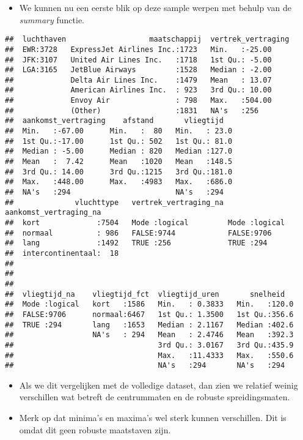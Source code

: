 \documentclass[]{memoir}
\providecommand{\tightlist}{%
  \setlength{\itemsep}{0pt}\setlength{\parskip}{0pt}}
\begin{document}
\begin{itemize}
\tightlist
\item
  We kunnen nu een eerste blik op deze sample werpen met behulp van de \emph{summary} functie.
\end{itemize}

\begin{verbatim}
##  luchthaven                   maatschappij  vertrek_vertraging
##  EWR:3728   ExpressJet Airlines Inc.:1723   Min.   :-25.00    
##  JFK:3107   United Air Lines Inc.   :1718   1st Qu.: -5.00    
##  LGA:3165   JetBlue Airways         :1528   Median : -2.00    
##             Delta Air Lines Inc.    :1479   Mean   : 13.07    
##             American Airlines Inc.  : 923   3rd Qu.: 10.00    
##             Envoy Air               : 798   Max.   :504.00    
##             (Other)                 :1831   NA's   :256       
##  aankomst_vertraging    afstand       vliegtijd    
##  Min.   :-67.00      Min.   :  80   Min.   : 23.0  
##  1st Qu.:-17.00      1st Qu.: 502   1st Qu.: 81.0  
##  Median : -5.00      Median : 820   Median :127.0  
##  Mean   :  7.42      Mean   :1020   Mean   :148.5  
##  3rd Qu.: 14.00      3rd Qu.:1215   3rd Qu.:181.0  
##  Max.   :448.00      Max.   :4983   Max.   :686.0  
##  NA's   :294                        NA's   :294    
##              vluchttype   vertrek_vertraging_na aankomst_vertraging_na
##  kort             :7504   Mode :logical         Mode :logical         
##  normaal          : 986   FALSE:9744            FALSE:9706            
##  lang             :1492   TRUE :256             TRUE :294             
##  intercontinentaal:  18                                               
##                                                                       
##                                                                       
##                                                                       
##  vliegtijd_na    vliegtijd_fct  vliegtijd_uren       snelheid    
##  Mode :logical   kort   :1586   Min.   : 0.3833   Min.   :120.0  
##  FALSE:9706      normaal:6467   1st Qu.: 1.3500   1st Qu.:356.6  
##  TRUE :294       lang   :1653   Median : 2.1167   Median :402.6  
##                  NA's   : 294   Mean   : 2.4746   Mean   :392.3  
##                                 3rd Qu.: 3.0167   3rd Qu.:435.9  
##                                 Max.   :11.4333   Max.   :550.6  
##                                 NA's   :294       NA's   :294
\end{verbatim}

\begin{itemize}
\tightlist
\item
  Als we dit vergelijken met de volledige dataset, dan zien we relatief weinig verschillen wat betreft de centrummaten en de robuste spreidingsmaten.
\item
  Merk op dat minima's en maxima's wel sterk kunnen verschillen. Dit is omdat dit geen robuste maatstaven zijn.
\end{itemize}
\end{document}
